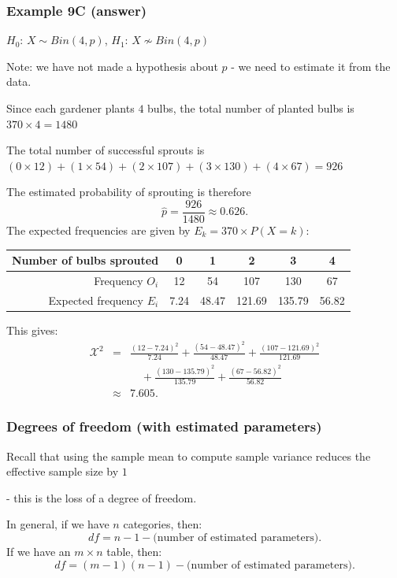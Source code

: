 \documentclass[t,8pt]{beamer}
\begin{document}
\begin{frame}
	\frametitle{Example 9C (answer)}
	$H_0$: $X\sim Bin(4,p)$, \quad $H_1$: $X\nsim Bin(4,p)$ \par
	Note: we have not made a hypothesis about $p$ - we need to estimate it from the data. \par
	Since each gardener plants $4$ bulbs, the total number of planted bulbs is $370 \times 4 = 1480$ \par
	The total number of successful sprouts is \\
	$(0 \times 12) + (1 \times 54) + (2 \times 107) + (3 \times 130) + (4 \times 67) = 926$ \par
	The estimated probability of sprouting is therefore
	\[
	\hat p=\frac{926}{1480} \approx 0.626.
	\]
	The expected frequencies are given by $E_k = 370 \times P(X = k)$:
	\begin{center}
		\begin{tabular}{r|ccccc}
			Number of bulbs sprouted & 0 & 1 & 2 & 3 & 4 \\ \hline
			Frequency $O_i$ & 12 & 54 & 107 & 130 & 67 \\ 
			Expected frequency $E_i$ & 7.24 & 48.47 & 121.69 & 135.79 & 56.82 \\ 
		\end{tabular}
	\end{center}
	This gives:
	\begin{eqnarray*}
		\mathcal{X}^2 &=& \frac{(12 - 7.24)^2}{7.24} + \frac{(54 - 48.47)^2}{48.47} + \frac{(107 - 121.69)^2}{121.69} \\
		&&\quad + \frac{(130 - 135.79)^2}{135.79} + \frac{(67 - 56.82)^2}{56.82}\\
		&\approx& 7.605.
	\end{eqnarray*}
\end{frame}

\begin{frame}
	\frametitle{Degrees of freedom (with estimated parameters)}
	Recall that using the sample mean to compute sample variance reduces the effective sample size by $1$ \par
	- this is the loss of a degree of freedom. \par
	In general, if we have $n$ categories, then:
	\[
	df = n - 1 - \text{(number of estimated parameters)}.
	\]
	If we have an $m\times n$ table, then:
	\[
	df = (m-1)(n-1) - \text{(number of estimated parameters)}.
	\]
\end{frame}
\end{document}
